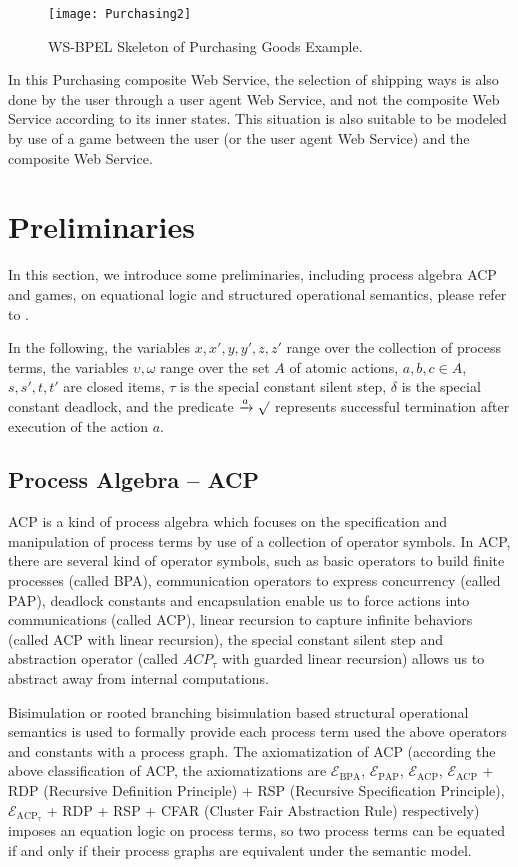 \documentclass{fac}
\begin{document}
\begin{figure}
  \centering
\texttt{[image: Purchasing2]}
  \caption{WS-BPEL Skeleton of Purchasing Goods Example.}
  \label{Purchasing2}
\end{figure}

In this Purchasing composite Web Service, the selection of shipping ways is also done by the user through a user agent Web Service, and not the composite Web Service according to its inner states. This situation is also suitable to be modeled by use of a game between the user (or the user agent Web Service) and the composite Web Service.

\section{Preliminaries}

In this section, we introduce some preliminaries, including process algebra ACP and games, on equational logic and structured operational semantics, please refer to \cite{ACP}.

In the following, the variables $x,x',y,y',z,z'$ range over the collection of process terms, the variables $\upsilon,\omega$ range over the set $A$ of atomic actions, $a,b,c\in A$, $s,s',t,t'$ are closed items, $\tau$ is the special constant silent step, $\delta$ is the special constant deadlock, and the predicate $\xrightarrow{a}\surd$ represents successful termination after execution of the action $a$.



\subsection{Process Algebra -- ACP}\label{ACPP}

ACP\cite{ACP} is a kind of process algebra which focuses on the specification and manipulation of process terms by use of a collection of operator symbols. In ACP, there are several kind of operator symbols, such as basic operators to build finite processes (called BPA), communication operators to express concurrency (called PAP), deadlock constants and encapsulation enable us to force actions into communications (called ACP), linear recursion to capture infinite behaviors (called ACP with linear recursion), the special constant silent step and abstraction operator (called $ACP_{\tau}$ with guarded linear recursion) allows us to abstract away from internal computations.

Bisimulation or rooted branching bisimulation based structural operational semantics is used to formally provide each process term used the above operators and constants with a process graph. The axiomatization of ACP (according the above classification of ACP, the axiomatizations are $\mathcal{E}_{\textrm{BPA}}$, $\mathcal{E}_{\textrm{PAP}}$, $\mathcal{E}_{\textrm{ACP}}$, $\mathcal{E}_{\textrm{ACP}}$ + RDP (Recursive Definition Principle) + RSP (Recursive Specification Principle), $\mathcal{E}_{\textrm{ACP}_\tau}$ + RDP + RSP + CFAR (Cluster Fair Abstraction Rule) respectively) imposes an equation logic on process terms, so two process terms can be equated if and only if their process graphs are equivalent under the semantic model.
\end{document}
